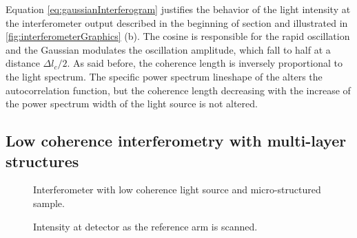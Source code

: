 \documentclass[12pt,twoside,english]{book}
\renewcommand{\~}{\perispomeni}%
\numberwithin{equation}{section}
\numberwithin{figure}{section}
\begin{document}
Equation \ref{eq:gaussianInterferogram} justifies the behavior of the light intensity at the interferometer output described in the beginning of section and illustrated in \ref{fig:interferometerGraphics} (b). The cosine is responsible for the rapid oscillation and the Gaussian modulates the oscillation amplitude, which fall to half at a distance $\Delta l_{c}/2$. As said before, the coherence length is inversely proportional to the light spectrum. The specific power spectrum lineshape of the alters the autocorrelation function, but the coherence length decreasing with the increase of the power spectrum width of the light source is not altered.

\subsection{Low coherence interferometry with multi-layer structures}

%
\begin{figure}[h]
\begin{minipage}[t]{0.48\columnwidth}%
\caption{Interferometer with low coherence light source and micro-structured sample. \label{fig:interferometer}}
%
\end{minipage}\hfill{}%
\begin{minipage}[t]{0.48\columnwidth}%
\caption{Intensity at detector as the reference arm is scanned.\label{fig:interferometer2}}
%
\end{minipage}
\end{figure}
\end{document}
